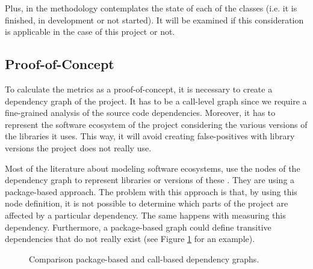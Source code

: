 Plus, in \cite{kama2014cochcomo} the methodology contemplates the state of each of the classes (i.e. it is finished, in development or not started). It will be examined if this consideration is applicable in the case of this project or not.

\subsection{Proof-of-Concept}
To calculate the metrics as a proof-of-concept, it is necessary to create a dependency graph of the project. It has to be a call-level graph since we require a fine-grained analysis of the source code dependencies. Moreover, it has to represent the software ecosystem of the project considering the various versions of the libraries it uses. This way, it will avoid creating false-positives with library versions the project does not really use.

Most of the literature about modeling software ecosystems, use the nodes of the dependency graph to represent libraries or versions of these \cite{decan2017empirical, hejderup2015dependencies, kikas2017structure}. They are using a package-based approach. The problem with this approach is that, by using this node definition, it is not possible to determine which parts of the project are affected by a particular dependency. The same happens with measuring this dependency. Furthermore, a package-based graph could define transitive dependencies that do not really exist (see Figure \ref{fig:example-call-based} for an example).

\begin{figure}[ht!]
    \centering
    \caption{Comparison package-based and call-based dependency graphs.}
    \label{fig:example-call-based}
\end{figure}

